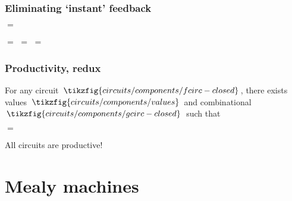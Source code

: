 \documentclass[aspectratio=169]{beamer}
\begin{document}
    \begin{frame}
        \frametitle{Eliminating `instant' feedback}
    
        
        \begin{center}
            \pause
            \quad$=$\quad

            \vspace{1em}

            \pause
            \quad$=$\quad
            \pause
            \quad$=$\quad
            \pause
            \quad$=$\quad
        \end{center}

    
    \end{frame}

    \begin{frame}
        \frametitle{Productivity, redux}
    
        \begin{theorem}
            For any circuit $\,\tikzfig{circuits/components/fcirc-closed}\,$, there exists values $\,\tikzfig{circuits/components/values}\,$ and combinational $\,\tikzfig{circuits/components/gcirc-closed}\,$ such that 

            \pause

            \begin{center}
                \quad$=$\quad
            \end{center}
        \end{theorem}
    
        \pause
        \alert{All} circuits are productive!

    \end{frame}

    \section{Mealy machines}

    \begin{frame}
        \frametitle{}
    
        
    
    \end{frame}
\end{document}
